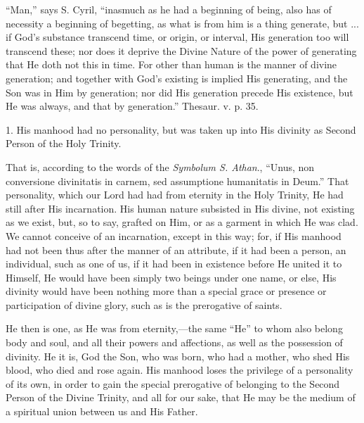 ``Man,'' says S. Cyril, ``inasmuch as he had a
beginning of being, also has of necessity a beginning of begetting, as
what is from him is a thing generate, but ... if God's substance
transcend time, or origin, or interval, His generation too will
transcend these; nor does it deprive the Divine Nature of the power of
generating that He doth not this in time. For other than human is the
manner of divine generation; and together with God's existing is
implied His generating, and the Son was in Him by generation; nor did
His generation precede His existence, but He was always, and that by
generation.'' Thesaur. v. p. 35.


1. His manhood had no personality, but was taken
up into His divinity as Second Person of the Holy Trinity.

That is, according to the words of the \emph{Symbolum
S. Athan}., ``Unus, non conversione divinitatis in carnem, sed
assumptione humanitatis in Deum.'' That personality, which our Lord had
had from eternity in the Holy Trinity, He had still after His
incarnation. His human nature subsisted in His divine, not existing as
we exist, but, so to say, grafted on Him, or as a garment in which He
was clad. We cannot conceive of an incarnation, except in this way;
for, if His manhood had not been thus after the manner of an
attribute, if it had been a person, an individual, such as one of us,
if it had been in existence before He united it to Himself, He would
have been simply two beings under one name, or else, His divinity
would have been nothing more than a special grace or presence or
participation of divine glory, such as is the prerogative of saints.

He then is one, as He was from eternity,—the
same ``He'' to whom also belong body and soul, and all their powers and
affections, as well as the possession of divinity. He it is, God the
Son, who was born, who had a mother, who shed His blood, who died and
rose again. His manhood loses the privilege of a personality of
its own, in order to gain the special prerogative of belonging to the
Second Person of the Divine Trinity, and all for our sake, that He may
be the medium of a spiritual union between us and His Father.

